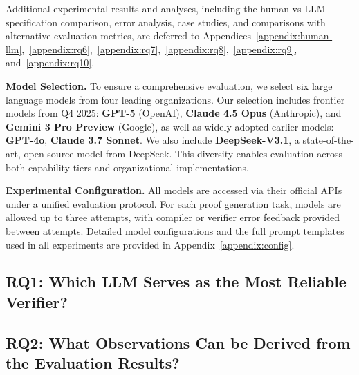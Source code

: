 \documentclass{article}
\theoremstyle{plain}
\theoremstyle{definition}
\theoremstyle{remark}
\begin{document}
Additional experimental results and analyses, including the human-vs-LLM specification comparison, error analysis, case studies, and comparisons with alternative evaluation metrics, are deferred to Appendices~\ref{appendix:human-llm},~\ref{appendix:rq6},~\ref{appendix:rq7},~\ref{appendix:rq8},~\ref{appendix:rq9}, and~\ref{appendix:rq10}.


\textbf{Model Selection.} To ensure a comprehensive evaluation, we select six large language models from four leading organizations. Our selection includes frontier models from Q4 2025: \textbf{GPT-5} (OpenAI), \textbf{Claude 4.5 Opus} (Anthropic), and \textbf{Gemini 3 Pro Preview} (Google), as well as widely adopted earlier models: \textbf{GPT-4o}, \textbf{Claude 3.7 Sonnet}. We also include \textbf{DeepSeek-V3.1}, a state-of-the-art, open-source model from DeepSeek. This diversity enables evaluation across both capability tiers and organizational implementations.

\textbf{Experimental Configuration.}
All models are accessed via their official APIs under a unified evaluation protocol.
For each proof generation task, models are allowed up to three attempts, with compiler or verifier error feedback provided between attempts.
Detailed model configurations and the full prompt templates used in all experiments are provided in Appendix~\ref{appendix:config}.


\subsection{RQ1: Which LLM Serves as the Most Reliable Verifier?}


\subsection{RQ2: What Observations Can be Derived from the Evaluation Results?}




\end{document}
